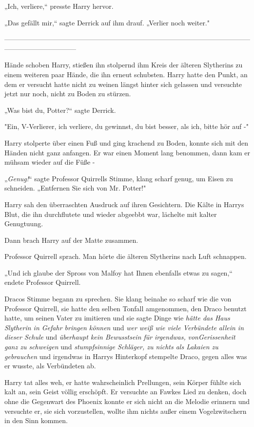 {„Ich, verliere,“ presste Harry hervor.

„Das gefällt mir,“ sagte Derrick auf ihm drauf. „Verlier noch weiter."

--------------------------------------------------------------------------------------------------------------------------------------------

\hfill\break Hände schoben Harry, stießen ihn stolpernd ihm Kreis der älteren Slytherins zu einem weiteren paar Hände, die ihn erneut schubsten. Harry hatte den Punkt, an dem er versucht hatte nicht zu weinen längst hinter sich gelassen und versuchte jetzt nur noch, nicht zu Boden zu stürzen.

„Was bist du, Potter?“ sagte Derrick.

"Ein, V-Verlierer, ich verliere, du gewinnst, du bist besser, als ich, bitte hör auf -"

Harry stolperte über einen Fuß und ging krachend zu Boden, konnte sich mit den Händen nicht ganz anfangen. Er war einen Moment lang benommen, dann kam er mühsam wieder auf die Füße -

„\emph{Genug!}“ sagte Professor Quirrells Stimme, klang scharf genug, um Eisen zu schneiden. „Entfernen Sie sich von Mr. Potter!"

Harry sah den überraschten Ausdruck auf ihren Gesichtern. Die Kälte in Harrys Blut, die ihn durchflutete und wieder abgeebbt war, lächelte mit kalter Genugtuung.

Dann brach Harry auf der Matte zusammen.

Professor Quirrell sprach. Man hörte die älteren Slytherins nach Luft schnappen.

„Und ich glaube der Spross von Malfoy hat Ihnen ebenfalls etwas zu sagen,“ endete Professor Quirrell.

Dracos Stimme begann zu sprechen. Sie klang beinahe so scharf wie die von Professor Quirrell, sie hatte den selben Tonfall amgenommen, den Draco benutzt hatte, um seinen Vater zu imitieren und sie sagte Dinge wie \emph{hätte das Haus Slytherin in Gefahr bringen können} und \emph{wer weiß wie viele Verbündete allein in dieser Schule} und \emph{überhaupt kein Bewusstsein für} \emph{irgendwas,} \emph{vonGerissenheit ganz zu schweigen} und \emph{stumpfsinnige Schläger, zu nichts als Lakaien zu gebrauchen} und irgendwas in Harrys Hinterkopf stempelte Draco, gegen alles was er wusste, als Verbündeten ab.

Harry tat alles weh, er hatte wahrscheinlich Prellungen, sein Körper fühlte sich kalt an, sein Geist völlig erschöpft. Er versuchte an Fawkes Lied zu denken, doch ohne die Gegenwart des Phoenix konnte er sich nicht an die Melodie erinnern und versuchte er, sie sich vorzustellen, wollte ihm nichts außer einem Vogelzwitschern in den Sinn kommen.

}
